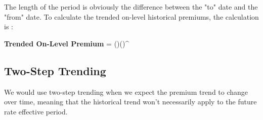 \documentclass[11pt, english]{memoir}
\numberwithin{definition}{section}
\begin{document}
	The length of the period is obviously the difference between the "to" date and the "from" date. To calculate the trended on-level historical premiums, the calculation is : 
	\begin{tcolorbox} 
	\textbf{Trended On-Level Premium} = ()()^{}
	\end{tcolorbox}
	
	
	
	
	\subsection{Two-Step Trending}
		We would use two-step trending when we expect the premium trend to change over time, meaning that the historical trend won't necessarily apply to the future rate effective period.
\end{document}
